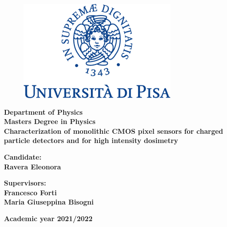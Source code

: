 \begin{figure}
    \vspace{10mm}
    \centering
    \includegraphics[keepaspectratio=true,scale=0.8]{figures/Logo-UNIPisa.png}
\end{figure}

\begin{center}
    \large{\textbf{Department of Physics\\Masters Degree in Physics}}\\
\vspace{15mm}
    \LARGE{\bf{Characterization of monolithic CMOS pixel sensors for charged particle detectors and for high intensity dosimetry }}
\end{center}
\vspace{40mm}
\begin{minipage}[t]{0.39\textwidth}
\large{\bf Candidate:\\Ravera Eleonora}
\end{minipage}
\hfill
\begin{minipage}[t]{0.55\textwidth}
\raggedleft
\large{\bf\bf Supervisors:\\Francesco Forti\\Maria Giuseppina Bisogni}\\
\end{minipage}
\vspace{45mm}
\begin{center}
    \large{\bf{Academic year 2021/2022}}
\end{center}